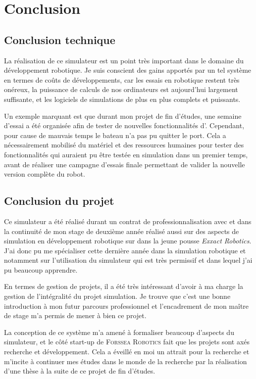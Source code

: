 \chapter{Conclusion}
\label{chapitre:conclusion}
	
	\section{Conclusion technique}

		La réalisation de ce simulateur est un point très important dans le domaine du développement robotique. Je suis conscient des gains apportés par un tel système en termes de coûts de développements, car les essais en robotique restent très onéreux, la puissance de calculs de nos ordinateurs est aujourd'hui largement suffisante, et les logiciels de simulations de plus en plus complets et puissants. 
		
		Un exemple marquant est que durant mon projet de fin d'études, une semaine d'essai a été organisée afin de tester de nouvelles fonctionnalités d'\argos{}. Cependant, pour cause de mauvais temps le bateau n'a pas pu quitter le port. Cela a nécessairement mobilisé du matériel et des ressources humaines pour tester des fonctionnalités qui auraient pu être testée en simulation dans un premier temps, avant de réaliser une campagne d'essais finale permettant de valider la nouvelle version complète du robot.
	
	\section{Conclusion du projet}

		Ce simulateur a été réalisé durant un contrat de professionnalisation avec \forssea{} et dans la continuité de mon stage de deuxième année réalisé aussi sur des aspects de simulation en développement robotique sur \gazebo{} dans la jeune pousse \textit{Exxact Robotics}. J'ai donc pu me spécialiser cette dernière année dans la simulation robotique et notamment sur l'utilisation du simulateur \gazebo{} qui est très permissif et dans lequel j'ai pu beaucoup apprendre.

		En termes de gestion de projets, il a été très intéressant d'avoir à ma charge la gestion de l'intégralité du projet simulation. Je trouve que c'est une bonne introduction à mon futur parcours professionnel et l'encadrement de mon maître de stage m'a permis de mener à bien ce projet.

		La conception de ce système m'a amené à formaliser beaucoup d'aspects du simulateur, et le côté start-up de \textsc{Forssea Robotics} fait que les projets sont axés recherche et développement. Cela a éveillé en moi un attrait pour la recherche et m'incite à continuer mes études dans le monde de la recherche par la réalisation d'une thèse à la suite de ce projet de fin d'études.